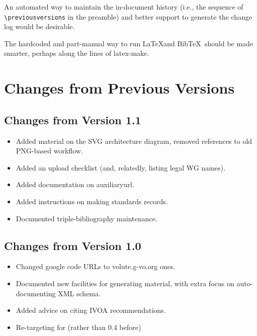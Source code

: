 \documentclass[11pt,a4paper]{ivoa}
\newcommand{\BibTeX}{BibTeX}
\begin{document}
An automated way to maintain the in-document history (i.e., the sequence
of \verb|\previousversions| in the preamble) and better support to
generate the change log would be desirable.

The hardcoded and part-manual way to run \LaTeX and \BibTeX~should be
made smarter, perhaps along the lines of latex-make.

\appendix
\section{Changes from Previous Versions}

\subsection{Changes from Version 1.1}

\begin{itemize}
\item Added material on the SVG architecture diagram, removed references
to old PNG-based workflow.
\item Added an upload checklist (and, relatedly, listing legal WG names).
\item Added documentation on auxiliaryurl.
\item Added instructions on making standards records.
\item Documented triple-bibliography maintenance.
\end{itemize}

\subsection{Changes from Version 1.0}
\begin{itemize}
\item Changed google code URLs to volute.g-vo.org ones.
\item Documented new facilities for generating material, with extra
focus on auto-documenting XML schema.
\item Added advice on citing IVOA recommendations.
\item Re-targeting for  (rather than 0.4 before)
\end{itemize}



\end{document}
